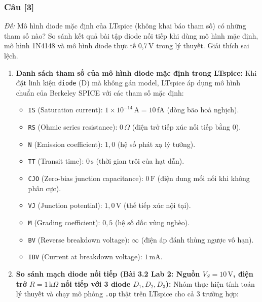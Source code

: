 \documentclass[12pt,a4paper]{article}
\newcommand{\cauhoi}[2]{%
  \subsubsection{Câu [#1]}
  \begin{tcolorbox}[colback=white,colframe=guidegray!70,boxrule=0.4pt,arc=1pt,left=5pt,right=5pt,top=2pt,bottom=2pt]
  \small\textit{Đề:} #2
  \end{tcolorbox}
  \par\vspace{4pt}}
\begin{document}
\cauhoi{3}{Mô hình diode mặc định của LTspice (không khai báo tham số) có những tham số nào? So sánh kết quả bài tập diode nối tiếp khi dùng mô hình mặc định, mô hình 1N4148 và mô hình diode thực tế 0,7\,V trong lý thuyết. Giải thích sai lệch.}

\begin{enumerate}[label=(\alph*)]
  \item \textbf{Danh sách tham số của mô hình diode mặc định trong LTspice:}
  Khi đặt linh kiện \texttt{diode} (D) mà không gán model, LTspice áp dụng mô hình chuẩn của Berkeley SPICE với các tham số mặc định:
  \begin{itemize}
    \item \texttt{IS} (Saturation current): $1 \times 10^{-14}\,\text{A} = 10\,\text{fA}$ (dòng bão hoà nghịch).
    \item \texttt{RS} (Ohmic series resistance): $0\,\Omega$ (điện trở tiếp xúc nối tiếp bằng 0).
    \item \texttt{N} (Emission coefficient): $1{,}0$ (hệ số phát xạ lý tưởng).
    \item \texttt{TT} (Transit time): $0\,\text{s}$ (thời gian trôi của hạt dẫn).
    \item \texttt{CJO} (Zero-bias junction capacitance): $0\,\text{F}$ (điện dung mối nối khi không phân cực).
    \item \texttt{VJ} (Junction potential): $1{,}0\,\text{V}$ (thế tiếp xúc nội tại).
    \item \texttt{M} (Grading coefficient): $0{,}5$ (hệ số dốc vùng nghèo).
    \item \texttt{BV} (Reverse breakdown voltage): $\infty$ (điện áp đánh thủng ngược vô hạn).
    \item \texttt{IBV} (Current at breakdown voltage): $1\,\text{mA}$.
  \end{itemize}

  \item \textbf{So sánh mạch diode nối tiếp (Bài 3.2 Lab 2: Nguồn $V_S = 10\,\text{V}$, điện trở $R = 1\,\text{k}\Omega$ nối tiếp với 3 diode $D_1, D_2, D_3$):}
  Nhóm thực hiện tính toán lý thuyết và chạy mô phỏng \texttt{.op} thật trên LTspice cho cả 3 trường hợp:


\end{enumerate}
\end{document}
